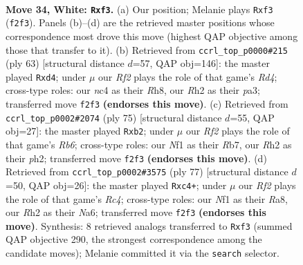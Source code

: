 \documentclass[11pt]{article}
\begin{document}
\clearpage

\begin{figure}[p]\centering
\begin{subfigure}{0.46\textwidth}\centering
\resizebox{\linewidth}{!}{%
\newchessgame
\chessboard[
  setfen={r1b1k3/8/8/1P4r1/p1n4p/3p1p1P/5RPR/K4N2 w q - 0 34},
  showmover=false,
  pgfstyle=straightmove, color=movearrow, markmove={f2-f3}
]}
\caption{}
\end{subfigure}\hfill
\begin{subfigure}{0.46\textwidth}\centering
\resizebox{\linewidth}{!}{%
\newchessgame
\chessboard[
  setfen={2k4r/2p5/p7/1P1rp3/1P1P1p1p/P6P/2K5/4RR2 b - - 0 32},
  showmover=false,
  pgfstyle=straightmove, color=movearrow, markmove={d5-d4}
]}
\caption{}
\end{subfigure}
\\[4pt]
\begin{subfigure}{0.46\textwidth}\centering
\resizebox{\linewidth}{!}{%
\newchessgame
\chessboard[
  setfen={8/1r4k1/5n1p/p1R3p1/P3p3/1r6/1P2B1PP/4R1K1 b - - 2 38},
  showmover=false,
  pgfstyle=straightmove, color=movearrow, markmove={b3-b2}
]}
\caption{}
\end{subfigure}\hfill
\begin{subfigure}{0.46\textwidth}\centering
\resizebox{\linewidth}{!}{%
\newchessgame
\chessboard[
  setfen={r7/p3k1p1/np6/2r1p2P/P1P1K3/6R1/3B4/7R b - - 4 39},
  showmover=false,
  pgfstyle=straightmove, color=movearrow, markmove={c5-c4}
]}
\caption{}
\end{subfigure}
\caption{\textbf{Move 34, White: \texttt{Rxf3}.} (a) Our position; Melanie plays \texttt{Rxf3} (\texttt{f2f3}). Panels (b)--(d) are the retrieved master positions whose correspondence most drove this move (highest QAP objective among those that transfer to it). (b) Retrieved from \texttt{ccrl\_top\_p0000\#215} (ply 63) [structural distance $d$=57, QAP obj=146]: the master played \texttt{Rxd4}; under $\mu$ our \emph{Rf2} plays the role of that game's \emph{Rd4}; cross-type roles: our \emph{n}c4 as their \emph{R}h8, our \emph{R}h2 as their \emph{p}a3; transferred move \texttt{f2f3} \textbf{(endorses this move)}. (c) Retrieved from \texttt{ccrl\_top\_p0002\#2074} (ply 75) [structural distance $d$=55, QAP obj=27]: the master played \texttt{Rxb2}; under $\mu$ our \emph{Rf2} plays the role of that game's \emph{Rb6}; cross-type roles: our \emph{N}f1 as their \emph{R}b7, our \emph{R}h2 as their \emph{p}h2; transferred move \texttt{f2f3} \textbf{(endorses this move)}. (d) Retrieved from \texttt{ccrl\_top\_p0002\#3575} (ply 77) [structural distance $d$=50, QAP obj=26]: the master played \texttt{Rxc4+}; under $\mu$ our \emph{Rf2} plays the role of that game's \emph{Rc4}; cross-type roles: our \emph{N}f1 as their \emph{R}a8, our \emph{R}h2 as their \emph{N}a6; transferred move \texttt{f2f3} \textbf{(endorses this move)}. Synthesis: 8 retrieved analogs transferred to \texttt{Rxf3} (summed QAP objective 290, the strongest correspondence among the candidate moves); Melanie committed it via the \texttt{search} selector.}
\label{fig:thought-m66}
\end{figure}
\end{document}
